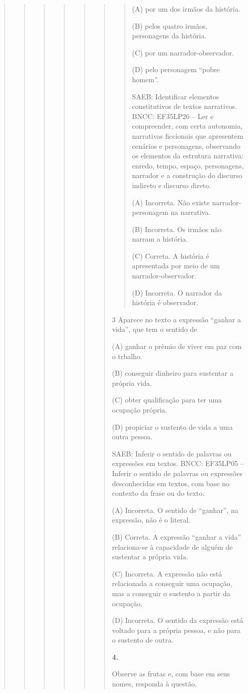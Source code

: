 \begin{boxlist}
{{\begin{quote}
\begin{quote}
\begin{quote}
{\begin{quote}
{\begin{quote}
\begin{quote}
\begin{quote}
(A) por um dos irmãos da história.

(B) pelos quatro irmãos, personagens da história.

(C) por um narrador-observador.

(D) pelo personagem ``pobre homem''.

SAEB: Identificar elementos constitutivos de textos narrativos.
BNCC: EF35LP26 -- Ler e compreender, com certa autonomia, narrativas
ficcionais que apresentem cenários e personagens, observando os
elementos da estrutura narrativa: enredo, tempo, espaço, personagens,
narrador e a construção do discurso indireto e discurso direto.

(A) Incorreta. Não existe narrador-personagem na narrativa.

(B) Incorreta. Os irmãos não narram a história.

(C) Correta. A história é apresentada por meio de um
narrador-observador.

(D) Incorreta. O narrador da história é observador.
\end{quote}

\num{3} Aparece no texto a expressão ``ganhar a vida'', que tem o sentido de

(A) ganhar o prêmio de viver em paz com o trbalho.

(B) conseguir dinheiro para sustentar a própria vida.

(C) obter qualificação para ter uma ocupação própria.

(D) propiciar o sustento de vida a uma outra pessoa.

SAEB: Inferir o sentido de palavras ou expressões em textos.
BNCC: EF35LP05 -- Inferir o sentido de palavras ou expressões desconhecidas em textos, com base no
contexto da frase ou do texto.

(A) Incorreta. O sentido de ``ganhar'', na expressão, não é o literal.

(B) Correta. A expressão ``ganhar a vida'' relaciona-se à capacidade de alguém de sustentar a própria vida.

(C) Incorreta. A expressão não está relacionada a conseguir uma ocupação, mas a conseguir o sustento a partir da ocupação.

(D) Incorreta. O sentido da expressão está voltado para a própria pessoa, e não para o sustento de outra.

\textbf{4.}

Observe as frutas e, com base em seus nomes, responda à questão.


\end{quote}
\end{quote}}
\end{quote}}
\end{quote}
\end{quote}
\end{quote}}}
\end{boxlist}
